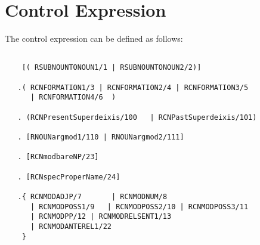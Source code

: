 \section{Control Expression}
The control expression can be defined as follows:
\begin{verbatim}

    [( RSUBNOUNTONOUN1/1 | RSUBNOUNTONOUN2/2)]

   .( RCNFORMATION1/3 | RCNFORMATION2/4 | RCNFORMATION3/5 
      | RCNFORMATION4/6  )

   . (RCNPresentSuperdeixis/100   | RCNPastSuperdeixis/101)

   . [RNOUNargmod1/110 | RNOUNargmod2/111]

   . [RCNmodbareNP/23]

   . [RCNspecProperName/24]

   .{ RCNMODADJP/7       | RCNMODNUM/8    
      | RCNMODPOSS1/9   | RCNMODPOSS2/10 | RCNMODPOSS3/11 
      | RCNMODPP/12 | RCNMODRELSENT1/13 
      | RCNMODANTEREL1/22
    }            

\end{verbatim}

